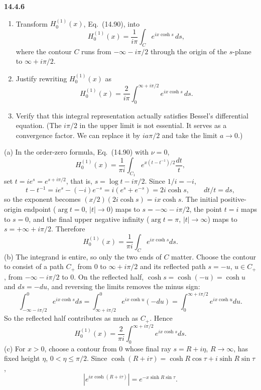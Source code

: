 \par\bigskip
\noindent\textbf{14.4.6}
\begin{enumerate}
\item[(a)] Transform $H_{0}^{(1)}(x)$, Eq.~(14.90), into
\[
H_{0}^{(1)}(x)=\frac{1}{i\pi}\int_{C}e^{ix\cosh s}\,ds,
\]
where the contour $C$ runs from $-\infty-i\pi/2$ through the origin of
the $s$-plane to $\infty+i\pi/2$.
\item[(b)] Justify rewriting $H_{0}^{(1)}(x)$ as
\[
H_{0}^{(1)}(x)=\frac{2}{i\pi}\int_{0}^{\infty+i\pi/2}
e^{ix\cosh s}\,ds.
\]
\item[(c)] Verify that this integral representation actually satisfies
Bessel's differential equation. (The $i\pi/2$ in the upper limit is
not essential. It serves as a convergence factor. We can replace it
by $ia\pi/2$ and take the limit $a\to0$.)
\end{enumerate}
\par{}
\solution
(a) In the order-zero formula, Eq.~(14.90) with $\nu=0$,
\[
H_0^{(1)}(x)=\frac1{\pi i}\int_{C_1}e^{x(t-t^{-1})/2}\frac{dt}t,
\]
set $t=ie^s=e^{s+i\pi/2}$, that is, $s=\log t-i\pi/2$. Since
$1/i=-i$,
\[
t-t^{-1}=ie^s-(-i)e^{-s}=i(e^s+e^{-s})=2i\cosh s,\qquad dt/t=ds,
\]
so the exponent becomes $(x/2)(2i\cosh s)=ix\cosh s$.
The initial positive-origin endpoint ($\arg t=0$, $|t|\to0$) maps
to $s=-\infty-i\pi/2$, the point $t=i$ maps to $s=0$, and the
final upper negative infinity ($\arg t=\pi$, $|t|\to\infty$) maps
to $s=+\infty+i\pi/2$. Therefore
\[
\boxed{H_0^{(1)}(x)=\frac1{\pi i}\int_Ce^{ix\cosh s}ds}.
\]
(b) The integrand is entire, so only the two ends of $C$ matter.
Choose the contour to consist of a path $C_+$ from $0$ to
$\infty+i\pi/2$ and its reflected path $s=-u$, $u\in C_+$, from
$-\infty-i\pi/2$ to $0$. On the reflected half,
$\cosh s=\cosh(-u)=\cosh u$ and $ds=-du$, and reversing the
limits removes the minus sign:
\[
\int_{-\infty-i\pi/2}^{0}e^{ix\cosh s}ds
=\int_{\infty+i\pi/2}^{0}e^{ix\cosh u}(-du)
=\int_0^{\infty+i\pi/2}e^{ix\cosh u}du.
\]
So the reflected half contributes as much as $C_+$. Hence
\[
\boxed{H_0^{(1)}(x)=\frac2{\pi i}
\int_0^{\infty+i\pi/2}e^{ix\cosh s}ds}.
\]
(c) For $x>0$, choose a contour from $0$ whose final ray
$s=R+i\eta$, $R\to\infty$, has fixed height $\eta$,
$0<\eta\le\pi/2$. Since
$\cosh(R+i\tau)=\cosh R\cos\tau+i\sinh R\sin\tau$,
\[
|e^{ix\cosh(R+i\tau)}|=e^{-x\sinh R\sin\tau}.
\]
